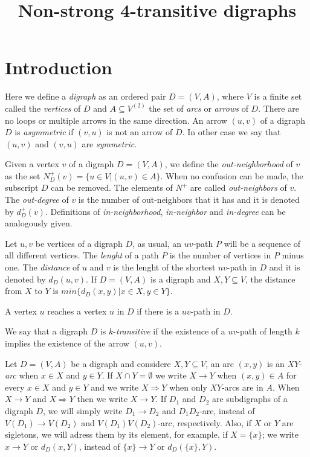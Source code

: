 \documentclass[a4paper,12pt]{article}
\begin{document}
\title{Non-strong 4-transitive digraphs}

\section{Introduction}

Here we define a \textit{digraph} as an ordered pair $D=(V,A)$, where $V$ is a finite set called the \textit{vertices} of $D$ and $A\subseteq V^{(2)}$ the set of \textit{arcs} or \textit{arrows} of $D$. There are no loops or multiple arrows in the same direction.
An arrow $(u,v)$ of a digraph $D$ is \textit{asymmetric} if $(v,u)$ is not an arrow of $D$. In other case we say that $(u,v)$ and $(v,u)$ are \textit{symmetric}.

Given a vertex $v$ of a digraph $D=(V,A)$, we define the \textit{out-neighborhood} of $v$ as the set $N_D^+(v)=\{u\in V|(u,v)\in A\}$. When no confusion can be made, the subscript $D$ can be removed. The elements of $N^+$ are called \textit{out-neighbors} of $v$. The \textit{out-degree} of $v$ is the number of out-neighbors that it has and it is denoted by $d_D^+(v)$. Definitions of \textit{in-neighborhood}, \textit{in-neighbor} and \textit{in-degree} can be analogously given.

Let $u,v$ be vertices of a digraph $D$, as usual, an $uv$-path $P$ will be a  sequence of all different vertices. The \textit{lenght} of a path $P$ is the number of vertices in $P$ minus one.
The \textit{distance} of $u$ and $v$ is the lenght of the shortest $uv$-path in $D$ and it is denoted by $d_D(u,v)$.
If $D=(V,A)$ is a digraph and $X,Y\subseteq V$, the distance from $X$ to $Y$ is $min\{d_D(x,y)|x\in X, y\in Y\}$.

A vertex $u$ reaches a vertex $u$ in $D$ if there is a $uv$-path in $D$.

We say that a digraph $D$ is $k$-\textit{transitive} if the existence of a $uv$-path of length $k$ implies the existence of the arrow $(u,v)$.

Let $D=(V,A)$ be a digraph and considere $X,Y\subseteq V$, an arc $(x,y)$ is an $XY$-\textit{arc} when $x\in X$ and $y\in Y$. If $X\cap Y=\emptyset$  we write $X\rightarrow Y$ when $(x,y)\in A$ for every $x\in X$ and $y\in Y$ and we write $X\Rightarrow Y$ when only $XY$-arcs are in $A$. When $X\rightarrow Y$ and $X\Rightarrow Y$ then we write $X\rightarrow Y$. If  $D_1$ and $D_2$ are subdigraphs of a digraph $D$, we will simply write $D_1\rightarrow D_2$ and $D_1D_2$-arc, instead of $V(D_1)\rightarrow V(D_2)$ and $V(D_1)V(D_2)$-arc, respectively. Also, if $X$ or $Y$ are sigletons, we will adress them by its element, for example, if $X=\{x\}$; we write $x\rightarrow Y$ or $d_D(x,Y)$, instead of $\{x\}\rightarrow Y$ or $d_D(\{x\},Y)$. 
\end{document}
